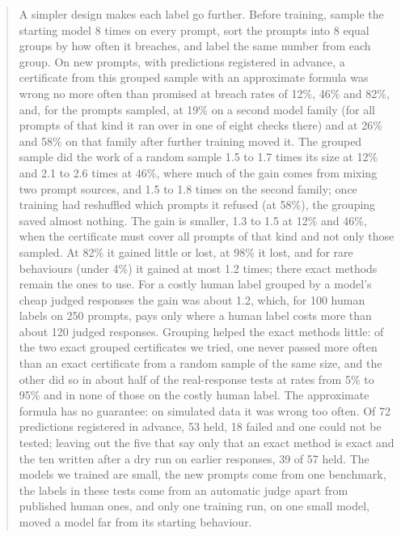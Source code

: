 \documentclass[11pt]{article}
\begin{document}
\begin{abstract}
A simpler design makes each label go further. Before training, sample the starting model 8 times on every prompt, sort the prompts into 8 equal groups by how often it breaches, and label the same number from each group. On new prompts, with predictions registered in advance, a certificate from this grouped sample with an approximate formula was wrong no more often than promised at breach rates of 12\%, 46\% and 82\%, and, for the prompts sampled, at 19\% on a second model family (for all prompts of that kind it ran over in one of eight checks there) and at 26\% and 58\% on that family after further training moved it. The grouped sample did the work of a random sample 1.5 to 1.7 times its size at 12\% and 2.1 to 2.6 times at 46\%, where much of the gain comes from mixing two prompt sources, and 1.5 to 1.8 times on the second family; once training had reshuffled which prompts it refused (at 58\%), the grouping saved almost nothing. The gain is smaller, 1.3 to 1.5 at 12\% and 46\%, when the certificate must cover all prompts of that kind and not only those sampled. At 82\% it gained little or lost, at 98\% it lost, and for rare behaviours (under 4\%) it gained at most 1.2 times; there exact methods remain the ones to use. For a costly human label grouped by a model's cheap judged responses the gain was about 1.2, which, for 100 human labels on 250 prompts, pays only where a human label costs more than about 120 judged responses. Grouping helped the exact methods little: of the two exact grouped certificates we tried, one never passed more often than an exact certificate from a random sample of the same size, and the other did so in about half of the real-response tests at rates from 5\% to 95\% and in none of those on the costly human label. The approximate formula has no guarantee: on simulated data it was wrong too often. Of 72 predictions registered in advance, 53 held, 18 failed and one could not be tested; leaving out the five that say only that an exact method is exact and the ten written after a dry run on earlier responses, 39 of 57 held. The models we trained are small, the new prompts come from one benchmark, the labels in these tests come from an automatic judge apart from published human ones, and only one training run, on one small model, moved a model far from its starting behaviour.



\end{abstract}
\end{document}
